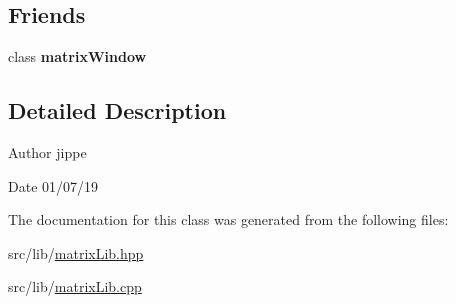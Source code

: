 \subsection*{Friends}
\begin{DoxyCompactItemize}
\item 
class {\bfseries matrix\+Window}
\end{DoxyCompactItemize}


\subsection{Detailed Description}
\begin{DoxyAuthor}{Author}
jippe 
\end{DoxyAuthor}
\begin{DoxyDate}{Date}
01/07/19 
\end{DoxyDate}


The documentation for this class was generated from the following files\+:\begin{DoxyCompactItemize}
\item 
src/lib/\hyperlink{matrix_lib_8hpp}{matrix\+Lib.\+hpp}\item 
src/lib/\hyperlink{matrix_lib_8cpp}{matrix\+Lib.\+cpp}\end{DoxyCompactItemize}

